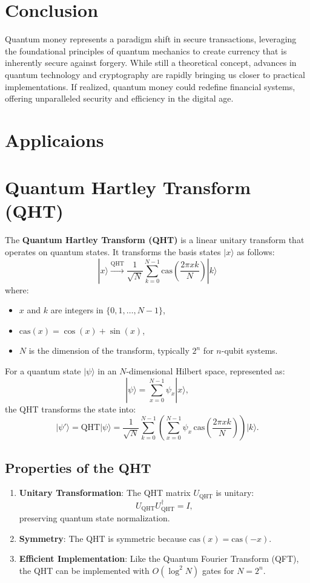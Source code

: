 \documentclass[11pt]{article}
\theoremstyle{definition}
\begin{document}
\section*{Conclusion}
Quantum money represents a paradigm shift in secure transactions, leveraging the foundational principles of quantum mechanics to create currency that is inherently secure against forgery. While still a theoretical concept, advances in quantum technology and cryptography are rapidly bringing us closer to practical implementations. If realized, quantum money could redefine financial systems, offering unparalleled security and efficiency in the digital age.




\section{Applicaions}


\section*{Quantum Hartley Transform (QHT)}

The \textbf{Quantum Hartley Transform (QHT)} is a linear unitary transform that operates on quantum states. It transforms the basis states \( |x\rangle \) as follows:
\[
|x\rangle \xrightarrow{\text{QHT}} \frac{1}{\sqrt{N}} \sum_{k=0}^{N-1} \text{cas}\left(\frac{2\pi x k}{N}\right) |k\rangle
\]
where:
\begin{itemize}
    \item \( x \) and \( k \) are integers in \( \{0, 1, \dots, N-1\} \),
    \item \( \text{cas}(x) = \cos(x) + \sin(x) \),
    \item \( N \) is the dimension of the transform, typically \( 2^n \) for \( n \)-qubit systems.
\end{itemize}

For a quantum state \( |\psi\rangle \) in an \( N \)-dimensional Hilbert space, represented as:
\[
|\psi\rangle = \sum_{x=0}^{N-1} \psi_x |x\rangle,
\]
the QHT transforms the state into:
\[
|\psi'\rangle = \text{QHT} |\psi\rangle = \frac{1}{\sqrt{N}} \sum_{k=0}^{N-1} \left( \sum_{x=0}^{N-1} \psi_x \, \text{cas}\left(\frac{2\pi x k}{N}\right) \right) |k\rangle.
\]

\subsection*{Properties of the QHT}
\begin{enumerate}
    \item \textbf{Unitary Transformation}: The QHT matrix \( U_{\text{QHT}} \) is unitary:
    \[
    U_{\text{QHT}} U_{\text{QHT}}^\dagger = I,
    \]
    preserving quantum state normalization.
    \item \textbf{Symmetry}: The QHT is symmetric because \( \text{cas}(x) = \text{cas}(-x) \).
    \item \textbf{Efficient Implementation}: Like the Quantum Fourier Transform (QFT), the QHT can be implemented with \( O(\log^2 N) \) gates for \( N = 2^n \).
\end{enumerate}
\end{document}
